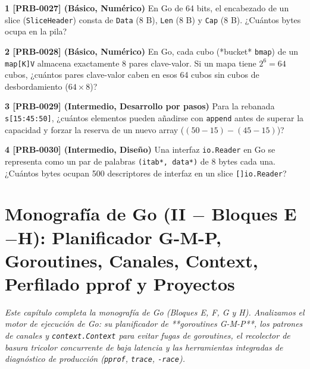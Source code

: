 \documentclass{book}
\begin{document}
\begin{tcolorbox}[title={Ejercicios}, studiumworked, breakable]

\noindent\textbf{1 [PRB-0027] (Básico, Numérico)}
En Go de 64 bits, el encabezado de un slice (\texttt{SliceHeader}) consta de \texttt{Data} (8 B), \texttt{Len} (8 B) y \texttt{Cap} (8 B). ¿Cuántos bytes ocupa en la pila?

\noindent\textbf{2 [PRB-0028] (Básico, Numérico)}
En Go, cada cubo (*bucket* \texttt{bmap}) de un \texttt{map[K]V} almacena exactamente 8 pares clave-valor. Si un mapa tiene \(2^6 = 64\) cubos, ¿cuántos pares clave-valor caben en esos 64 cubos sin cubos de desbordamiento (\(64 \times 8\))?

\noindent\textbf{3 [PRB-0029] (Intermedio, Desarrollo por pasos)}
Para la rebanada \texttt{s[15:45:50]}, ¿cuántos elementos pueden añadirse con \texttt{append} antes de superar la capacidad y forzar la reserva de un nuevo array (\((50 - 15) - (45 - 15)\))?

\noindent\textbf{4 [PRB-0030] (Intermedio, Diseño)}
Una interfaz \texttt{io.Reader} en Go se representa como un par de palabras \texttt{(itab*, data*)} de 8 bytes cada una. ¿Cuántos bytes ocupan 500 descriptores de interfaz en un slice \texttt{[]io.Reader}?
\end{tcolorbox}

\chapter{Monografía de Go (II \(-\) Bloques E\(-\)H): Planificador G-M-P, Goroutines, Canales, Context, Perfilado pprof y Proyectos}
\label{chap:cap06-go-avanzado-experto-goroutines-gmp-canales-context-proyectos}

\noindent\textit{Este capítulo completa la monografía de Go (Bloques E, F, G y H). Analizamos el motor de ejecución de Go: su planificador de **goroutines G-M-P**, los patrones de canales y \texttt{context.Context} para evitar fugas de goroutines, el recolector de basura tricolor concurrente de baja latencia y las herramientas integradas de diagnóstico de producción (\texttt{pprof}, \texttt{trace}, \texttt{-race}).}
\end{document}
